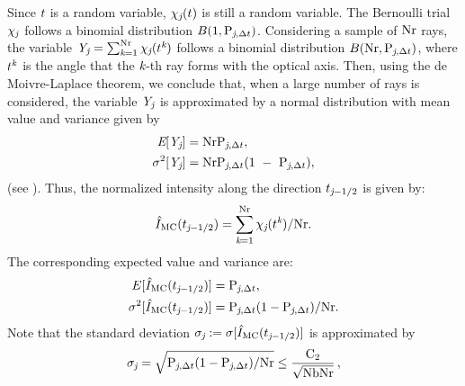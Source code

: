 Since $t$ is a random variable, $\chi_{\textit{j}}(t)$ is still a random variable. The Bernoulli trial $ \chi_{\textit{j}}$ follows a binomial distribution $B(1,\textrm{P}_{\textit{j}, \Delta t})$.
Considering a sample of $\textrm{Nr}$ rays, the variable $\textit{Y}_{\textit{j}} = \sum_{\textit{k}=1}^{\textrm{Nr}} \chi_{\textit{j}}(t^{\textit{k}})$
follows a binomial distribution $B(\textrm{Nr}, \textrm{P}_{\textit{j},\Delta t})$, where $t^{\textit{k}}$ is the angle that the $\textit{k}$-th ray forms
 with the optical axis. Then, using the de Moivre-Laplace theorem, we conclude that, when a large number of rays is considered, the variable $\textit{Y}_{\textit{j}}$ is approximated by a normal distribution with mean value and variance given by 
\begin{subequations}
\begin{align}
\textit{E}[\textit{Y}_{\textit{j}}] &= \textrm{Nr}\textrm{P}_{\textit{j}, \Delta t}, \\ \sigma^2[\textit{Y}_{\textit{j}}] &= \textrm{Nr}\textrm{P}_{\textit{j}, \Delta t}(1~-~\textrm{P}_{\textit{j}, \Delta t}),\end{align}
\end{subequations}
(see \cite{zolotarev1997modern, rubinstein2016simulation}).
Thus, the normalized intensity along the direction $t_{\textit{j}-1/2}$ is given by:
\begin{equation}\label{eq:approssimazione_MCraytracing}
\hat{I}_{\textrm{MC}}(t_{\textit{j}-1/2}) = \sum_{\textit{k}=1}^{\textrm{Nr}}\chi_{\textit{j}}(t^{\textit{k}})/\textrm{Nr}.\end{equation}
The corresponding expected value and variance are:
\begin{subequations}
\begin{align}E[\hat{I}_{\textrm{MC}}(t_{\textit{j}-1/2})]&=\textrm{P}_{\textit{j}, \Delta t},\\ \label{eq:variance_I}
\sigma^2[\hat{I}_{\textrm{MC}}(t_{\textit{j}-1/2})] &= \textrm{P}_{\textit{j}, \Delta t}(1-\textrm{P}_{\textit{j}, \Delta t})/\textrm{Nr}.
\end{align}
\end{subequations}
Note that the standard deviation $\sigma_{\textit{j}}:=\sigma[\hat{I}_{\textrm{MC}}(t_{\textit{j}-1/2})]$ is approximated by
\begin{equation}\label{sigma}
\sigma_{\textit{j}}= \sqrt{\textrm{P}_{\textit{j}, \Delta t}(1-\textrm{P}_{\textit{j}, \Delta t})/\textrm{Nr}}\leq\frac{\textrm{C}_2}{\sqrt{\textrm{Nb}\textrm{Nr}}}\,, \end{equation}
